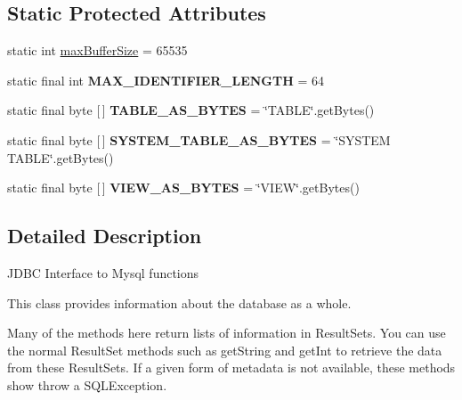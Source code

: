 \subsection*{Static Protected Attributes}
\begin{DoxyCompactItemize}
\item 
static int \mbox{\hyperlink{classcom_1_1mysql_1_1cj_1_1jdbc_1_1_database_meta_data_a1ae01f7ebe1259fcaf0680504abba3a3}{max\+Buffer\+Size}} = 65535
\item 
\mbox{\label{classcom_1_1mysql_1_1cj_1_1jdbc_1_1_database_meta_data_a44cddec3650fe00c054fb2d953bb1f9e}} 
static final int {\bfseries M\+A\+X\+\_\+\+I\+D\+E\+N\+T\+I\+F\+I\+E\+R\+\_\+\+L\+E\+N\+G\+TH} = 64
\item 
\mbox{\label{classcom_1_1mysql_1_1cj_1_1jdbc_1_1_database_meta_data_abb219ee6082368e35120e3336386c19a}} 
static final byte \mbox{[}$\,$\mbox{]} {\bfseries T\+A\+B\+L\+E\+\_\+\+A\+S\+\_\+\+B\+Y\+T\+ES} = \char`\"{}T\+A\+B\+LE\char`\"{}.get\+Bytes()
\item 
\mbox{\label{classcom_1_1mysql_1_1cj_1_1jdbc_1_1_database_meta_data_a5f59d4fa1965ab97c6e7370be6b87004}} 
static final byte \mbox{[}$\,$\mbox{]} {\bfseries S\+Y\+S\+T\+E\+M\+\_\+\+T\+A\+B\+L\+E\+\_\+\+A\+S\+\_\+\+B\+Y\+T\+ES} = \char`\"{}S\+Y\+S\+T\+EM T\+A\+B\+LE\char`\"{}.get\+Bytes()
\item 
\mbox{\label{classcom_1_1mysql_1_1cj_1_1jdbc_1_1_database_meta_data_a4d5a906eb142bbaef590b90c6f59dd85}} 
static final byte \mbox{[}$\,$\mbox{]} {\bfseries V\+I\+E\+W\+\_\+\+A\+S\+\_\+\+B\+Y\+T\+ES} = \char`\"{}V\+I\+EW\char`\"{}.get\+Bytes()
\end{DoxyCompactItemize}


\subsection{Detailed Description}
J\+D\+BC Interface to Mysql functions 

This class provides information about the database as a whole. 

Many of the methods here return lists of information in Result\+Sets. You can use the normal Result\+Set methods such as get\+String and get\+Int to retrieve the data from these Result\+Sets. If a given form of metadata is not available, these methods show throw a S\+Q\+L\+Exception. 

